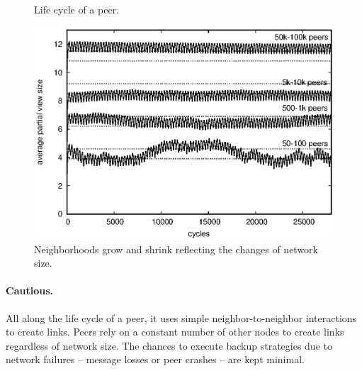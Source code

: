 \begin{figure}
  \begin{center}
    \hspace{20pt}
    \hspace{20pt}
    \caption{\label{fig:cycle} Life cycle of a peer.}
  \end{center}
\end{figure}


\begin{figure}
  \begin{center}
    \includegraphics[width=\SCALE\textwidth]{./img/extended.eps}
    \caption{\label{fig:extended} Neighborhoods grow and shrink reflecting the
      changes of network size.}
  \end{center}
\end{figure}


\paragraph{Cautious.}
All along the life cycle of a peer, it uses simple neighbor-to-neighbor
interactions to create links.  Peers rely on a constant number of other nodes to
create links regardless of network size. The chances to execute backup
strategies due to network failures -- message losses or peer crashes -- are kept
minimal.

